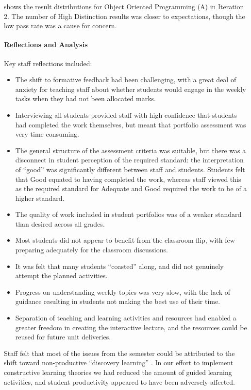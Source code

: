  shows the result distributions for Object Oriented Programming (A) in Iteration 2. The number of High Distinction results was closer to expectations, though the low pass rate was a cause for concern. 

\paragraph{Reflections and Analysis} %
\label{ssub:staff_reflections_and_analysis2}

Key staff reflections included:
\begin{itemize}[noitemsep,nolistsep]
  \item The shift to formative feedback had been challenging, with a great deal of anxiety for teaching staff about whether students would engage in the weekly tasks when they had not been allocated marks. 
  \item Interviewing all students provided staff with high confidence that students had completed the work themselves, but meant that portfolio assessment was very time consuming.
  \item The general structure of the assessment criteria was suitable, but there was a disconnect in student perception of the required standard: the interpretation of ``good'' was significantly different between staff and students. Students felt that Good equated to having completed the work, whereas staff viewed this as the required standard for Adequate and Good required the work to be of a higher standard.
  \item The quality of work included in student portfolios was of a weaker standard than desired across all grades.
  \item Most students did not appear to benefit from the classroom flip, with few preparing adequately for the classroom discussions.
  \item It was felt that many students ``coasted'' along, and did not genuinely attempt the planned activities.
  \item Progress on understanding weekly topics was very slow, with the lack of guidance resulting in students not making the best use of their time.
  \item Separation of teaching and learning activities and resources had enabled a greater freedom in creating the interactive lecture, and the resources could be reused for future unit deliveries.
\end{itemize}

Staff felt that most of the issues from the semester could be attributed to the shift toward non-productive ``discovery learning'' \cite{Anderson:1998}. In our effort to implement constructive learning theories we had reduced the amount of guided learning activities, and student productivity appeared to have been adversely affected.


